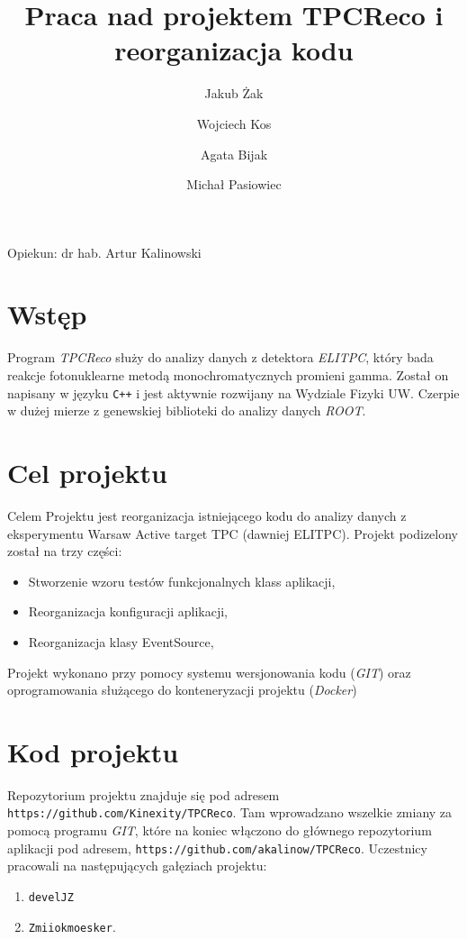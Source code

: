 \documentclass{article}
\title{Praca nad projektem TPCReco i reorganizacja kodu}
\author{Jakub Żak \and Wojciech Kos \and Agata Bijak \and Michał Pasiowiec}
\date{}
\begin{document}
\maketitle
\vfill
\centerline{\large Opiekun: dr hab. Artur Kalinowski}
\vfill

\pagebreak
\section{Wstęp}
Program \textit{TPCReco} służy do analizy danych z detektora \textit{ELITPC}, który bada reakcje fotonuklearne metodą monochromatycznych promieni gamma. Został on napisany w języku \texttt{C++} i jest aktywnie rozwijany na Wydziale Fizyki UW. Czerpie w dużej mierze z genewskiej biblioteki do analizy danych \textit{ROOT}\cite{cern}.

\section{Cel projektu}
Celem Projektu jest reorganizacja istniejącego kodu do analizy danych z eksperymentu Warsaw Active target TPC (dawniej ELITPC).
Projekt podizelony został na trzy części: 


\begin{itemize}
    \item Stworzenie wzoru testów funkcjonalnych klass aplikacji, 
    \item Reorganizacja konfiguracji aplikacji,
    \item Reorganizacja klasy  EventSource,
\end{itemize}
Projekt wykonano przy pomocy systemu wersjonowania kodu (\textit{GIT}\cite{git}) oraz oprogramowania służącego do konteneryzacji projektu (\textit{Docker}\cite{docker})

\vfill
\pagebreak

\section{Kod projektu}
\label{kod}
Repozytorium projektu znajduje się pod adresem \texttt{https://github.com/Kinexity/TPCReco}. Tam wprowadzano wszelkie zmiany za pomocą programu \textit{GIT}, które na koniec włączono do głównego repozytorium aplikacji pod adresem, \texttt{https://github.com/akalinow/TPCReco}. Uczestnicy pracowali na następujących gałęziach projektu:
\begin{enumerate}
    \item \texttt{develJZ}
    \item \texttt{Zmiiokmoesker}.
\end{enumerate}
\end{document}

